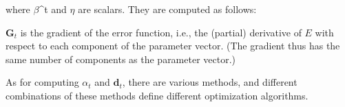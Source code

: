 where $\beta$^{t} and $\eta$ are scalars. They are computed as follows:

$\textbf{G}_{t}$ is the gradient of the error function, i.e., the (partial) derivative of $E$ with respect to each component
of the parameter vector. (The gradient thus has the same number of components as the parameter vector.)


As for computing $\alpha_t$ and $\mathbf{d}_{t}$, there are various methods, and different combinations of these methods define different optimization algorithms. 







